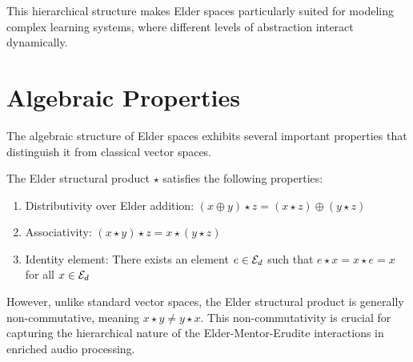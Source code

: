 This hierarchical structure makes Elder spaces particularly suited for modeling complex learning systems, where different levels of abstraction interact dynamically.

\section{Algebraic Properties}

The algebraic structure of Elder spaces exhibits several important properties that distinguish it from classical vector spaces.

\begin{proposition}
The Elder structural product $\star$ satisfies the following properties:
\begin{enumerate}
    \item Distributivity over Elder addition: $(x \oplus y) \star z = (x \star z) \oplus (y \star z)$
    \item Associativity: $(x \star y) \star z = x \star (y \star z)$
    \item Identity element: There exists an element $e \in \mathcal{E}_{d}$ such that $e \star x = x \star e = x$ for all $x \in \mathcal{E}_{d}$
\end{enumerate}
\end{proposition}

However, unlike standard vector spaces, the Elder structural product is generally non-commutative, meaning $x \star y \neq y \star x$. This non-commutativity is crucial for capturing the hierarchical nature of the Elder-Mentor-Erudite interactions in enriched audio processing.